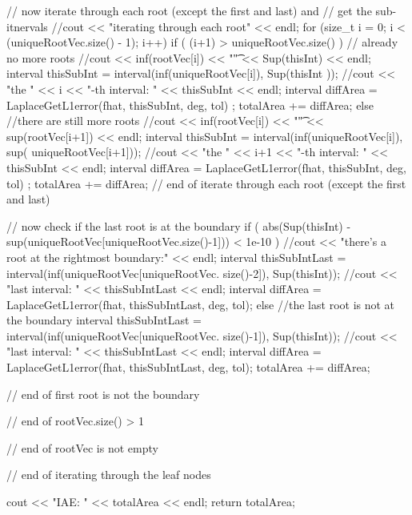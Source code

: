 \begin{DoxyCode}
{{{{{          // now iterate through each root (except the first and last) and 
          // get the sub-itnervals
          //cout << "iterating through each root" << endl;
          for (size_t i = 0; i < (uniqueRootVec.size() - 1); i++) {
            if ( (i+1) > uniqueRootVec.size() ) { // already no more roots
              //cout << inf(rootVec[i]) << "\t" << Sup(thisInt) << endl;
              interval thisSubInt = interval(inf(uniqueRootVec[i]), Sup(thisInt
      ));
              //cout << "the " << i << "-th interval: " << thisSubInt << endl;
              interval diffArea = LaplaceGetL1error(fhat, thisSubInt, deg, tol)
      ;
              totalArea += diffArea;
            }
            else { //there are still more roots
              //cout << inf(rootVec[i]) << "\t" << sup(rootVec[i+1]) << endl;
              interval thisSubInt = interval(inf(uniqueRootVec[i]), sup(
      uniqueRootVec[i+1]));
              //cout << "the " << i+1 << "-th interval: " << thisSubInt <<
       endl;
              interval diffArea = LaplaceGetL1error(fhat, thisSubInt, deg, tol)
      ;
              totalArea += diffArea;
            }
          } // end of iterate through each root (except the first and last)
          
          // now check if the last root is at the boundary
          if ( abs(Sup(thisInt) - sup(uniqueRootVec[uniqueRootVec.size()-1])) <
       1e-10 ) {
            //cout << "there's a root at the rightmost boundary:" << endl;
            interval thisSubIntLast = interval(inf(uniqueRootVec[uniqueRootVec.
      size()-2]), Sup(thisInt));
            //cout << "last interval: " << thisSubIntLast << endl; 
            interval diffArea = LaplaceGetL1error(fhat, thisSubIntLast, deg, 
      tol);
          }
          else { //the last root is not at the boundary
            interval thisSubIntLast = interval(inf(uniqueRootVec[uniqueRootVec.
      size()-1]), Sup(thisInt));
            //cout << "last interval: " << thisSubIntLast << endl; 
            interval diffArea = LaplaceGetL1error(fhat, thisSubIntLast, deg, 
      tol);
            totalArea += diffArea;
          } 
        } // end of first root is not the boundary
      } // end of rootVec.size() > 1
    } // end of rootVec is not empty

  } // end of iterating through the leaf nodes
  
  cout << "IAE: " << totalArea << endl;
  return totalArea;
}
\end{DoxyCode}
